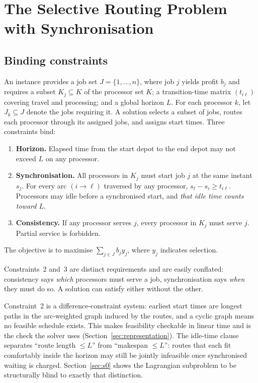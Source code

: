 \documentclass[11pt,a4paper]{article}
\newcommand{\Kj}{\ensuremath{K_j}}
\begin{document}
\section{The Selective Routing Problem with Synchronisation}\label{sec:problem}

\subsection{Binding constraints}\label{sec:constraints}

An instance provides a job set $J=\{1,\dots,n\}$, where job $j$ yields profit
$b_j$ and requires a subset $\Kj\subseteq K$ of the processor set $K$; a
transition-time matrix $(t_{i\ell})$ covering travel and processing; and a global
horizon $L$. For each processor $k$, let $J_k\subseteq J$ denote the jobs
requiring it. A solution selects a subset of jobs, routes each processor through
its assigned jobs, and assigns start times. Three constraints bind:

\begin{enumerate}
  \item \textbf{Horizon.} Elapsed time from the start depot to the end depot may
    not exceed $L$ on any processor.
  \item \textbf{Synchronisation.} All processors in $\Kj$ must start job $j$ at
    the same instant $s_j$. For every arc $(i\to \ell)$ traversed by any
    processor, $s_\ell-s_i\ge t_{i\ell}$. Processors may idle before a
    synchronised start, and \emph{that idle time counts toward $L$}.
  \item \textbf{Consistency.} If any processor serves $j$, every processor in
    $\Kj$ must serve $j$. Partial service is forbidden.
\end{enumerate}

The objective is to maximise $\sum_{j\in J} b_j y_j$, where $y_j$ indicates
selection.

Constraints~2 and~3 are distinct requirements and are easily conflated:
consistency says \emph{which} processors must serve a job, synchronisation says
\emph{when} they must do so. A solution can satisfy either without the other.

Constraint~2 is a difference-constraint system: earliest start times are longest
paths in the arc-weighted graph induced by the routes, and a cyclic graph means no
feasible schedule exists. This makes feasibility checkable in linear time and is
the check the solver uses (Section~\ref{sec:representation}). The idle-time clause
separates ``route length $\le L$'' from ``makespan $\le L$'': routes that each fit
comfortably inside the horizon may still be jointly infeasible once synchronised
waiting is charged. Section~\ref{sec:s0} shows the Lagrangian subproblem to be
structurally blind to exactly that distinction.
\end{document}
